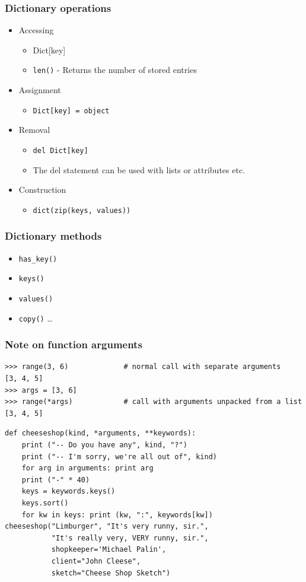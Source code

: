 \documentclass{beamer}
\begin{document}
\begin{frame}
\frametitle{Dictionary operations}
\begin{itemize}
\item Accessing
\begin{itemize}
\item Dict[key]
\item \texttt{len()} - Returns the number of stored entries
\end{itemize}
\item Assignment 
\begin{itemize}
\item \texttt{Dict[key] = object }
\end{itemize}
\item Removal
\begin{itemize}
\item \texttt{del Dict[key]}
\item The del statement can be used with lists or attributes etc.
\end{itemize}
\item Construction
\begin{itemize}
\item \texttt{dict(zip(keys, values)) }
\end{itemize}
\end{itemize}
\end{frame}

\begin{frame}
\frametitle{Dictionary methods}
\begin{itemize}
\item \texttt{has\_key()}
\item \texttt{keys()}
\item \texttt{values()}
\item \texttt{copy()}
\ldots
\end{itemize}
\end{frame}

\begin{frame}[containsverbatim]
\frametitle{Note on function arguments}
\begin{lstlisting}
>>> range(3, 6)             # normal call with separate arguments
[3, 4, 5]
>>> args = [3, 6]
>>> range(*args)            # call with arguments unpacked from a list
[3, 4, 5]
\end{lstlisting}
\begin{lstlisting}
def cheeseshop(kind, *arguments, **keywords):
    print ("-- Do you have any", kind, "?")
    print ("-- I'm sorry, we're all out of", kind)
    for arg in arguments: print arg
    print ("-" * 40)
    keys = keywords.keys()
    keys.sort()
    for kw in keys: print (kw, ":", keywords[kw])
cheeseshop("Limburger", "It's very runny, sir.",
           "It's really very, VERY runny, sir.",
           shopkeeper='Michael Palin',
           client="John Cleese",
           sketch="Cheese Shop Sketch")
\end{lstlisting}
\end{frame}
\end{document}

